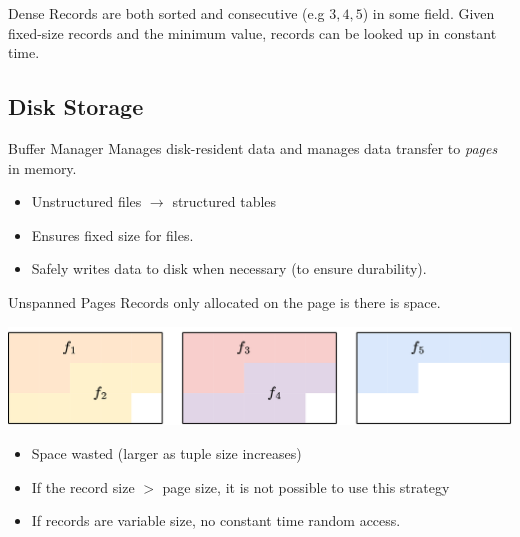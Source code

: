 \begin{definitionbox}{Dense}
    Records are both sorted and consecutive (e.g $3,4,5$) in some field. Given fixed-size records and the minimum value, records can be looked up in constant time. 
\end{definitionbox}

\subsection{Disk Storage}
\begin{definitionbox}{Buffer Manager}
    Manages disk-resident data and manages data transfer to \textit{pages} in memory.
    \begin{itemize}
        \item Unstructured files $\to$ structured tables
        \item Ensures fixed size for files.
        \item Safely writes data to disk when necessary (to ensure durability).
    \end{itemize}
\end{definitionbox}

\begin{definitionbox}{Unspanned Pages}
    Records only allocated on the page is there is space.
    \begin{center}
        \includegraphics[width=.8\textwidth]{storage/images/unspanned_page.drawio.png}
    \end{center}
    \begin{itemize}
        \item Space wasted (larger as tuple size increases)
        \item If the record size $>$ page size, it is not possible to use this strategy
        \item If records are variable size, no constant time random access.
    \end{itemize}
\end{definitionbox}

